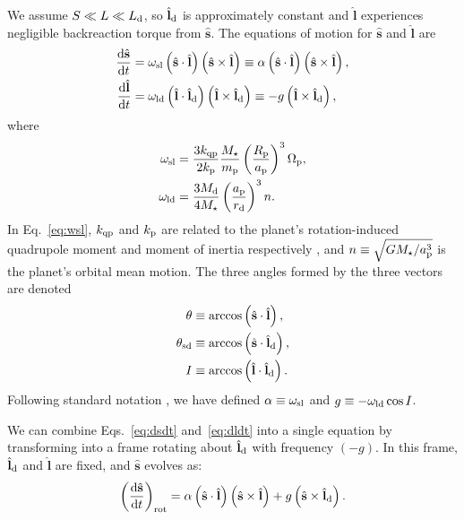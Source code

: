 \documentclass[
        fleqn,
        usenatbib,
    ]{mnras}
\newcommand*{\rd}[2]{\frac{\mathrm{d}#1}{\mathrm{d}#2}}
\newcommand*{\bm}[1]{\boldsymbol{\mathbf{#1}}}
\newcommand*{\uv}[1]{\hat{\bm{#1}}}
\newcommand*{\p}[1]{\left(#1\right)}
\begin{document}
We assume $S \ll L \ll L_{\rm d}$, so $\uv{l}_{\rm d}$ is approximately
constant and $\uv{l}$ experiences negligible backreaction torque from
$\uv{s}$. The equations of motion for $\uv{s}$ and $\uv{l}$
are
\begin{align}
    \rd{\uv{s}}{t} &= \omega_{\rm sl} \p{\uv{s} \cdot \uv{l}}
            \p{\uv{s} \times \uv{l}}
        \equiv \alpha \p{\uv{s} \cdot \uv{l}}
            \p{\uv{s} \times \uv{l}},\label{eq:dsdt}\\
    \rd{\uv{l}}{t} &= \omega_{\rm ld}\p{\uv{l} \cdot \uv{l}_{\rm d}}
            \p{\uv{l} \times \uv{l}_{\rm d}}
        \equiv -g\p{\uv{l} \times \uv{l}_{\rm d}},
            \label{eq:dldt}
\end{align}
where
\begin{align}
    \omega_{\rm sl} &= \frac{3k_{\rm qp}}{2k_{\rm p}} \frac{M_\star}{m_{\rm
        p}} \p{\frac{R_{\rm p}}{a_{\rm p}}}^3 \Omega_{\rm p},\label{eq:wsl}\\
    \omega_{\rm ld} &= \frac{3M_{\rm d}}{4M_\star}\p{\frac{a_{\rm
        p}}{r_{\rm d}}}^3 n .\label{eq:wld}
\end{align}
In Eq.~\eqref{eq:wsl}, $k_{\rm qp}$ and $k_{\rm p}$ are related to the planet's
rotation-induced quadrupole moment and moment of inertia respectively
\citep[see][]{lai2018}, and $n \equiv \sqrt{GM_\star/a_{\rm p}^3}$ is the
planet's orbital mean motion. The three angles formed by the three vectors are
denoted
\begin{align}
    \theta &\equiv \arccos \p{\uv{s} \cdot \uv{l}},\\
    \theta_{\rm sd} &\equiv \arccos \p{\uv{s} \cdot \uv{l}_{\rm d}},\\
    I &\equiv \arccos \p{\uv{l} \cdot \uv{l}_{\rm d}}.
\end{align}
Following standard notation \citep[e.g.][]{colombo1966,peale1969,ward2004I}, we
have defined $\alpha \equiv \omega_{\rm sl}$ and $g \equiv -\omega_{\rm ld}\cos
I$.

We can combine Eqs.~\eqref{eq:dsdt} and~\eqref{eq:dldt} into a single equation
by transforming into a frame rotating about $\uv{l}_{\rm d}$ with
frequency $(-g)$. In this frame, $\uv{l}_{\rm d}$ and $\uv{l}$ are fixed, and
$\uv{s}$ evolves as:
\begin{equation}
    \p{\rd{\uv{s}}{t}}_{\rm rot} = \alpha \p{\uv{s} \cdot \uv{l}}
            \p{\uv{s} \times \uv{l}}
        + g\p{\uv{s} \times \uv{l}_{\rm d}}.\label{eq:dsdt_rot}
\end{equation}
\end{document}
